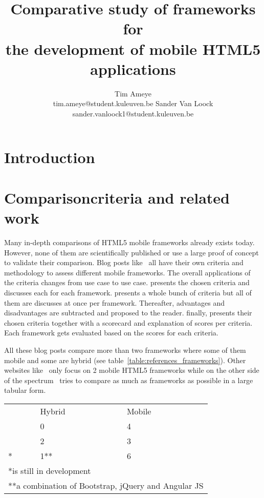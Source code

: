 \documentclass[a4paper]{article}
\title{Comparative study of frameworks for \\ the development of mobile HTML5 applications}
\author{Tim Ameye \\ tim.ameye@student.kuleuven.be \And Sander Van Loock \\ sander.vanloock1@student.kuleuven.be}
\begin{document}
\maketitle

\begin{abstract}

\end{abstract}

\section{Introduction} %
\label{sec:introduction}

\section{Comparisoncriteria and related work}
\label{sec:comparisoncriteria}

Many in-depth comparisons of HTML5 mobile frameworks already exists today.  However, none of them are scientifically published or use a large proof of concept to validate their comparison.  Blog posts like~\cite{Sarrafi2012a,Ayuso2012,Rozynski2011} all have their own criteria and methodology to assess different mobile frameworks.  The overall applications of the criteria changes from use case to use case.  \cite{Rozynski2011} presents the chosen criteria and discusses each for each framework.  \cite{Ayuso2012} presents a whole bunch of criteria but all of them are discusses at once per framework.  Thereafter,  advantages and disadvantages are subtracted and proposed to the reader.  \cite{Sarrafi2012a} finally,  presents their chosen criteria together with a scorecard and explanation of scores per criteria.  Each framework gets evaluated based on the scores for each criteria.

All these blog posts compare more than two frameworks where some of them mobile and some are hybrid (see table~\ref{table:references_frameworks}).  Other websites like~\cite{Bristowe2012,Burris} only focus on 2 mobile HTML5 frameworks while on the other side of the spectrum~\cite{Falk2011} tries to compare as much as frameworks as possible in a large tabular form.


\begin{center}
\begin{tabular}{lll}
  & Hybrid & Mobile\\
\cite{Sarrafi2012a} & 0 & 4\\
\cite{Rozynski2011} & 2 & 3\\
\cite{Ayuso2012}* & 1** & 6 \\
\multicolumn{3}{l}{*is still in development} \\
\multicolumn{3}{l}{**a combination of Bootstrap, jQuery and Angular JS}
\label{table:references_frameworks}
\end{tabular}
\end{center}
\end{document}
